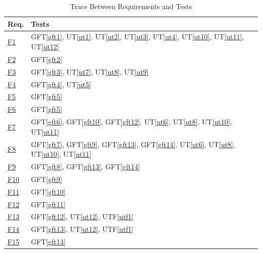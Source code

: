\documentclass[12pt, titlepage]{article}
\begin{document}
\begin{table}[H]
\centering
\begin{tabular}{p{} p{}}
\toprule
\textbf{Req.} & \textbf{Tests}\\
\midrule
\href{../SRS/SRS.pdf#f1}{F1} & GFT\ref{gft1}, UT\ref{ut1}. UT\ref{ut2}, UT\ref{ut3}, UT\ref{ut4}, UT\ref{ut10}, UT\ref{ut11}, UT\ref{ut12}\\
\href{../SRS/SRS.pdf#f2}{F2} & GFT\ref{gft2}\\
\href{../SRS/SRS.pdf#f3}{F3} & GFT\ref{gft3}, UT\ref{ut7}, UT\ref{ut8}, UT\ref{ut9}\\
\href{../SRS/SRS.pdf#f4}{F4} & GFT\ref{gft4}, UT\ref{ut5}\\
\href{../SRS/SRS.pdf#f5}{F5} & GFT\ref{gft5}\\
\href{../SRS/SRS.pdf#f6}{F6} & GFT\ref{gft5}\\
\href{../SRS/SRS.pdf#f7}{F7} & GFT\ref{gft6}, GFT\ref{gft10}, GFT\ref{gft12}, UT\ref{ut6}, UT\ref{ut8}, UT\ref{ut10}, UT\ref{ut11}\\
\href{../SRS/SRS.pdf#f8}{F8} & GFT\ref{gft7}, GFT\ref{gft9}, GFT\ref{gft13}, GFT\ref{gft14}, UT\ref{ut6}, UT\ref{ut8}, UT\ref{ut10}, UT\ref{ut11}\\
\href{../SRS/SRS.pdf#f9}{F9} & GFT\ref{gft8}, GFT\ref{gft13}, GFT\ref{gft14}\\
\href{../SRS/SRS.pdf#f10}{F10} & GFT\ref{gft9}\\
\href{../SRS/SRS.pdf#f11}{F11} & GFT\ref{gft10}\\
\href{../SRS/SRS.pdf#f12}{F12} & GFT\ref{gft11}\\
\href{../SRS/SRS.pdf#f13}{F13} & GFT\ref{gft12}, UT\ref{ut12}, UTF\ref{utf1}\\
\href{../SRS/SRS.pdf#f14}{F14} & GFT\ref{gft13}, UT\ref{ut12}, UTF\ref{utf1}\\
\href{../SRS/SRS.pdf#f15}{F15} & GFT\ref{gft14}\\
\bottomrule
\end{tabular}
\caption{Trace Between Requirements and Tests}
\label{TblRT}
\end{table}
		
\end{document}
